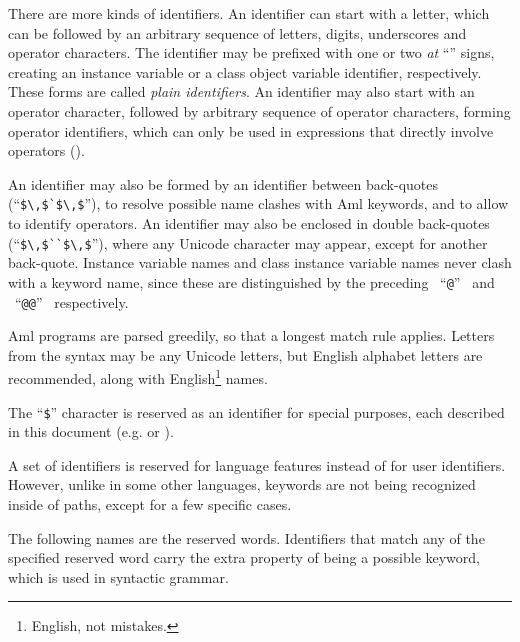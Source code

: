 There are more kinds of identifiers. An identifier can start with a letter, which can be followed by an arbitrary sequence of letters, digits, underscores and operator characters. The identifier may be prefixed with one or two {\em at} ``'' signs, creating an instance variable or a class object variable identifier, respectively. These forms are called {\em plain identifiers}. An identifier may also start with an operator character, followed by arbitrary sequence of operator characters, forming operator identifiers, which can only be used in expressions that directly involve operators (). 

An identifier may also be formed by an identifier between back-quotes (``\lstinline!$\,$`$\,$!''), to resolve possible name clashes with Aml keywords, and to allow to identify operators. An identifier may also be enclosed in double back-quotes (``\lstinline!$\,$``$\,$!''), where any Unicode character may appear, except for another back-quote. Instance variable names and class instance variable names never clash with a keyword name, since these are distinguished by the preceding ~``\lstinline!@!''~ and ~``\lstinline!@@!''~ respectively. 

Aml programs are parsed greedily, so that a longest match rule applies. Letters from the syntax may be any Unicode letters, but English alphabet letters are recommended, along with English\footnote{English, not mistakes.} names.

The ``\lstinline[mathescape=false]!$!'' character is reserved as an identifier for special purposes, each described in this document (e.g.  or ).

A set of identifiers is reserved for language features instead of for user identifiers. However, unlike in some other languages, keywords are not being recognized inside of paths, except for a few specific cases.

The following names are the reserved words. Identifiers that match any of the specified reserved word carry the extra property of being a possible keyword, which is used in syntactic grammar. 

